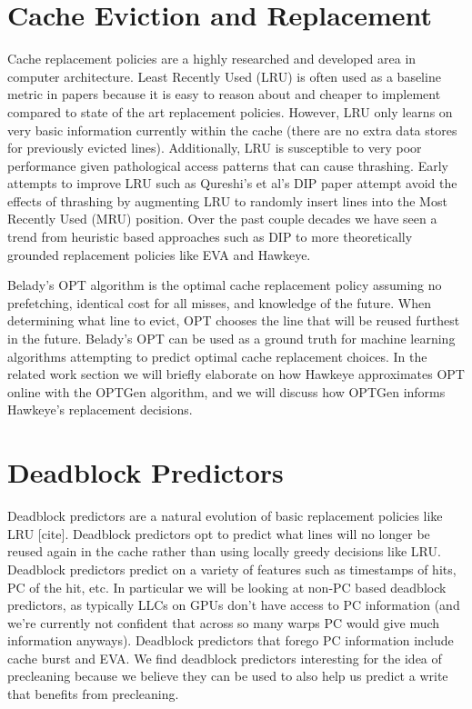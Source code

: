 \section{Cache Eviction and Replacement}
Cache replacement policies are a highly researched and developed area in computer architecture. Least Recently Used (LRU) is often used as a baseline metric in papers because it is easy to reason about and cheaper to implement compared to state of the art replacement policies. However, LRU only learns on very basic information currently within the cache (there are no extra data stores for previously evicted lines). Additionally, LRU is susceptible to very poor performance given pathological access patterns that can cause thrashing. Early attempts to improve LRU such as Qureshi’s et al’s DIP paper \cite{dip} attempt avoid the effects of thrashing by augmenting LRU to randomly insert lines into the Most Recently Used (MRU) position. Over the past couple decades we have seen a trend from heuristic based approaches such as DIP to more theoretically grounded replacement policies like EVA \cite{eva} and Hawkeye.

Belady’s OPT algorithm \cite{belady_opt} is the optimal cache replacement policy assuming no prefetching, identical cost for all misses, and knowledge of the future. When determining what line to evict, OPT chooses the line that will be reused furthest in the future. Belady’s OPT can be used as a ground truth for machine learning algorithms attempting to predict optimal cache replacement choices. In the related work section we will briefly elaborate on how Hawkeye approximates OPT online with the OPTGen algorithm, and we will discuss how OPTGen informs Hawkeye’s replacement decisions.

\section{Deadblock Predictors}
Deadblock predictors are a natural evolution of basic replacement policies like LRU [cite]. Deadblock predictors opt to predict what lines will no longer be reused again in the cache rather than using locally greedy decisions like LRU. Deadblock predictors predict on a variety of features such as timestamps of hits, PC of the hit, etc. In particular we will be looking at non-PC based deadblock predictors, as typically LLCs on GPUs don’t have access to PC information (and we’re currently not confident that across so many warps PC would give much information anyways). Deadblock predictors that forego PC information include cache burst and EVA. We find deadblock predictors interesting for the idea of precleaning because we believe they can be used to also help us predict a write that benefits from precleaning.
